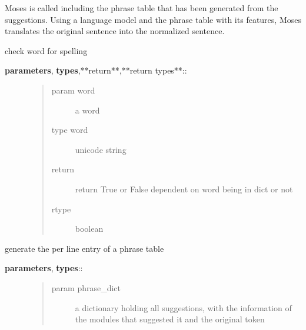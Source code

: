 \documentclass[letterpaper,10pt,english]{sphinxmanual}
\begin{document}
\begin{fulllineitems}
\begin{fulllineitems}
Moses is called including the phrase table that has been generated from the suggestions.
Using a language model and the phrase table with its features, Moses translates the             original sentence into the normalized sentence.

\end{fulllineitems}


\begin{fulllineitems}
\label{API:norm.normalizer.Normalizer._check_hunspell}
check word for spelling
\begin{description}
\item[{\textbf{parameters}, \textbf{types},**return**,**return types**::}] \leavevmode\begin{quote}\begin{description}
\item[{param word}] \leavevmode
a word

\item[{type word}] \leavevmode
unicode string

\item[{return}] \leavevmode
return True or False dependent on word being in dict or not

\item[{rtype}] \leavevmode
boolean

\end{description}\end{quote}

\end{description}

\end{fulllineitems}


\begin{fulllineitems}
\label{API:norm.normalizer.Normalizer._generate_phrase_table}
generate the per line entry of a phrase table
\begin{description}
\item[{\textbf{parameters}, \textbf{types}::}] \leavevmode\begin{quote}\begin{description}
\item[{param phrase\_dict}] \leavevmode
a dictionary holding all suggestions, with the information of the modules that suggested it and the original token


\end{description}
\end{quote}
\end{description}
\end{fulllineitems}
\end{fulllineitems}
\end{document}

